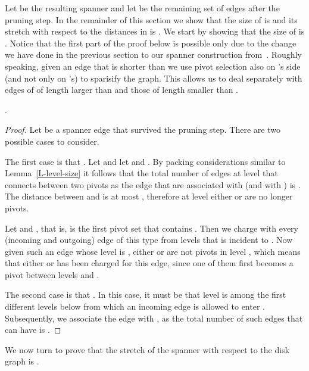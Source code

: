 \documentclass[proceedings]{stacs}
\theoremstyle{plain}\newtheorem{satz}[thm]{Satz}
\theoremstyle{definition}\newtheorem{crucial}[thm]{Crucial Definition}
\begin{document}
Let  be the resulting spanner and let  be the
remaining set of edges after the pruning step. In the remainder of
this section we show that the size of  is
 and its stretch with respect to the distances in
 is . We start by showing that the size of
 is . Notice that the first part of the
proof below is possible only due to the change we have done in the
previous section to our spanner construction from~\cite{PeRo08}.
Roughly speaking, given an edge  that is shorter than
 we use pivot selection also on 's side (and not only on
's) to sparisify the graph. This allows us to deal separately
with edges of  of length larger than  and those of length
smaller than .

\begin{lemma}\label{L-smaller}
.
\end{lemma}
\begin{proof}
Let  be a spanner edge that survived the pruning step.
There are two possible cases to consider.

The first case is that . Let 
and let  and . By packing
considerations similar to Lemma~\ref{L-level-size} it follows that
the total number of edges at level  that connects between two
pivots as the edge  that are associated with  (and with
) is . The distance between  and  is at
most , therefore at level  either
 or  are no longer pivots.

Let  and , that is,  is the first
pivot set that contains . Then we charge  with every
(incoming and outgoing) edge of this type from levels
 that is incident to . Now given such an edge
 whose level is , either  or  are not pivots in
level , which means that either  or  has been
charged for this edge, since one of them first becomes a pivot
between levels  and .

The second case is that . In this case, it
must be that level   is among the  first
different levels below  from which an incoming edge is
allowed to enter . Subsequently, we associate the edge 
with , as the total number of such edges that  can have is
.
\end{proof}


We now turn to prove that the stretch of the spanner 
with respect to the disk graph  is .
\end{document}
